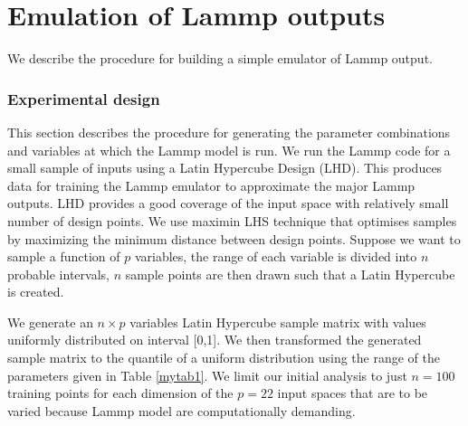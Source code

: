\documentclass[12pt,titlepage]{report}
\theoremstyle{definition}
\theoremstyle{remark}
\begin{document}
\chapter*{Emulation of Lammp outputs}
We describe the procedure for building a simple emulator of Lammp output.
\subsection*{Experimental design}
This section describes the procedure for generating the parameter combinations and variables at which the Lammp model is run. We run the Lammp code for a small sample of inputs using a Latin Hypercube Design (LHD). This produces data for training the Lammp emulator to approximate the major Lammp outputs. LHD provides a good coverage of the input space with relatively small number of design points. We use maximin LHS technique that optimises samples by maximizing the minimum distance between design points. Suppose we want to sample a function of $p$ variables, the range of each variable is divided into $n$ probable intervals, $n$ sample points are then drawn such that a Latin Hypercube is created.

We generate an $n \times p$ variables Latin Hypercube sample matrix with values uniformly distributed on interval [0,1]. We then transformed the generated sample matrix to the quantile of a uniform distribution using the range of the parameters given in Table \ref{mytab1}. We limit our initial analysis to just $n=100$ training points for each dimension of the $p=22$ input spaces that are to be varied because Lammp model are computationally demanding. %

\end{document}
